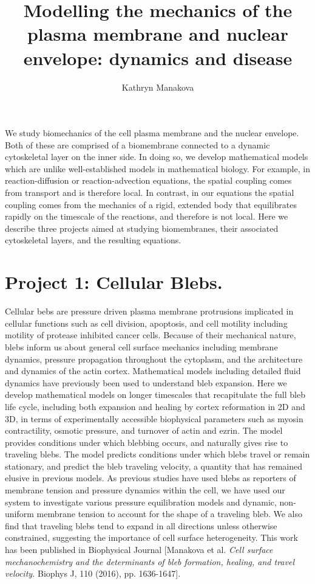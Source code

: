 \documentclass[11pt]{amsart}
\title{Modelling the mechanics of the plasma membrane and nuclear envelope: dynamics and disease}
\author{Kathryn Manakova}
\date{}                                           %
\begin{document}
\maketitle

 We study biomechanics of the cell plasma membrane and the nuclear envelope. Both of these are comprised of a biomembrane connected to a dynamic cytoskeletal layer on the inner side. In doing so, we develop mathematical models which are unlike well-established models in mathematical biology. For example, in reaction-diffusion or reaction-advection equations, the spatial coupling comes from transport and is therefore local. In contrast, in our equations the spatial coupling comes from the mechanics of a rigid, extended body that equilibrates rapidly on the timescale of the reactions, and therefore is not local. Here we describe three projects aimed at studying biomembranes, their associated cytoskeletal layers, and the resulting equations.


\section*{Project 1: Cellular Blebs.}
Cellular bebs are pressure driven plasma membrane protrusions implicated in cellular functions such as cell division, apoptosis, and cell motility including motility of protease inhibited cancer cells. Because of their mechanical nature, blebs inform us about general cell surface mechanics including membrane dynamics, pressure propagation throughout the cytoplasm, and the architecture and dynamics of the actin cortex. Mathematical models including detailed fluid dynamics have previously been used to understand bleb expansion. Here we develop mathematical models on longer timescales that recapitulate the full bleb life cycle, including both expansion and healing by cortex reformation in 2D and 3D, in terms of experimentally accessible biophysical parameters such as myosin contractility, osmotic pressure, and turnover of actin and ezrin. The model provides conditions under which blebbing occurs, and naturally gives rise to traveling blebs. The model predicts conditions under which blebs travel or remain stationary, and predict the bleb traveling velocity, a quantity that has remained elusive in previous models.  As previous studies have used blebs as reporters of membrane tension and pressure dynamics within the cell, we have used our system to investigate various pressure equilibration models and dynamic, non-uniform membrane tension to account for the shape of a traveling bleb. We also find that traveling blebs tend to expand in all directions unless otherwise constrained, suggesting the importance of cell surface heterogeneity. This work has been published in Biophysical Journal [Manakova et al. \textit{Cell surface mechanochemistry and the determinants of bleb formation, healing, and travel velocity.} Biophys J, 110 (2016), pp. 1636-1647].
\end{document}
